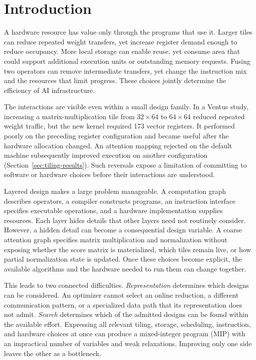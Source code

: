 \section{Introduction}
A hardware resource has value only through the programs that use it. Larger tiles can reduce repeated weight transfers, yet increase register demand enough to reduce occupancy. More local storage can enable reuse, yet consume area that could support additional execution units or outstanding memory requests. Fusing two operators can remove intermediate transfers, yet change the instruction mix and the resources that limit progress. These choices jointly determine the efficiency of AI infrastructure.

The interactions are visible even within a small design family. In a Ventus study, increasing a matrix-multiplication tile from $32\times64$ to $64\times64$ reduced repeated weight traffic, but the new kernel required 173 vector registers. It performed poorly on the preceding register configuration and became useful after the hardware allocation changed. An attention mapping rejected on the default machine subsequently improved execution on another configuration (Section~\ref{sec:tiling-results}). Such reversals expose a limitation of committing to software or hardware choices before their interactions are understood.

Layered design makes a large problem manageable. A computation graph describes operators, a compiler constructs programs, an instruction interface specifies executable operations, and a hardware implementation supplies resources. Each layer hides details that other layers need not routinely consider. However, a hidden detail can become a consequential design variable. A coarse attention graph specifies matrix multiplication and normalization without exposing whether the score matrix is materialized, which tiles remain live, or how partial normalization state is updated. Once these choices become explicit, the available algorithms and the hardware needed to run them can change together.

This leads to two connected difficulties. \emph{Representation} determines which designs can be considered. An optimizer cannot select an online reduction, a different communication pattern, or a specialized data path that its representation does not admit. \emph{Search} determines which of the admitted designs can be found within the available effort. Expressing all relevant tiling, storage, scheduling, instruction, and hardware choices at once can produce a mixed-integer program (MIP) with an impractical number of variables and weak relaxations. Improving only one side leaves the other as a bottleneck.

